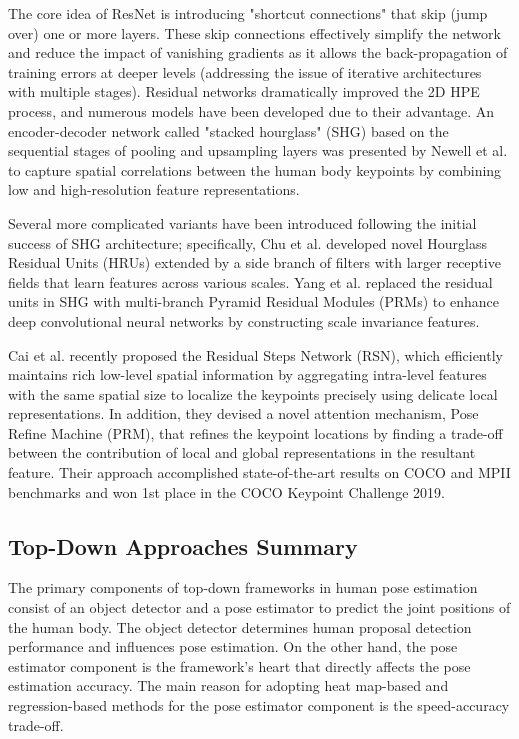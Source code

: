 The core idea of ResNet is introducing "shortcut connections" that skip (jump over) one or more layers. These skip connections effectively simplify the network and reduce the impact of vanishing gradients as it allows the back-propagation of training errors at deeper levels (addressing the issue of iterative architectures with multiple stages). Residual networks dramatically improved the 2D HPE process, and numerous models
\cite{cai_learning_2020, chen_cascaded_2018, chu_multi-context_2017, ke_multi-scale_2018, liu_cascaded_2018, newell_stacked_2016, su_multi-person_2019, sun_deep_2019, xiao_simple_2018-1, yang_learning_2017} have been developed due to their advantage. An encoder-decoder network called "stacked hourglass" (SHG) based on the sequential stages of pooling and upsampling layers was presented by Newell et al. \cite{newell_stacked_2016} to capture spatial correlations between the human body keypoints by combining low and high-resolution feature representations. 

Several more complicated variants have been introduced following the initial success of SHG architecture; specifically, Chu et al. \cite{chu_multi-context_2017} developed novel Hourglass Residual Units (HRUs) extended by a side branch of filters with larger receptive fields that learn features across various scales. Yang et al. \cite{yang_learning_2017} replaced the residual units in SHG with multi-branch Pyramid Residual Modules (PRMs) to enhance deep convolutional neural networks by constructing scale invariance features. 

Cai et al. \cite{cai_learning_2020} recently proposed the Residual Steps Network (RSN), which efficiently maintains rich low-level spatial information by aggregating intra-level features with the same spatial size to localize the keypoints precisely using delicate local representations. In addition, they devised a novel attention mechanism, Pose Refine Machine (PRM), that refines the keypoint locations by finding a trade-off between the contribution of local and global representations in the resultant feature. Their approach accomplished state-of-the-art results on COCO and MPII benchmarks and won 1st place in the COCO Keypoint Challenge 2019.


\subsection{Top-Down Approaches Summary}

The primary components of top-down frameworks in human pose estimation consist of an object detector and a pose estimator to predict the joint positions of the human body. The object detector determines human proposal detection performance and influences pose estimation. On the other hand, the pose estimator component is the framework's heart that directly affects the pose estimation accuracy. The main reason for adopting heat map-based and regression-based methods for the pose estimator component is the speed-accuracy trade-off. 

